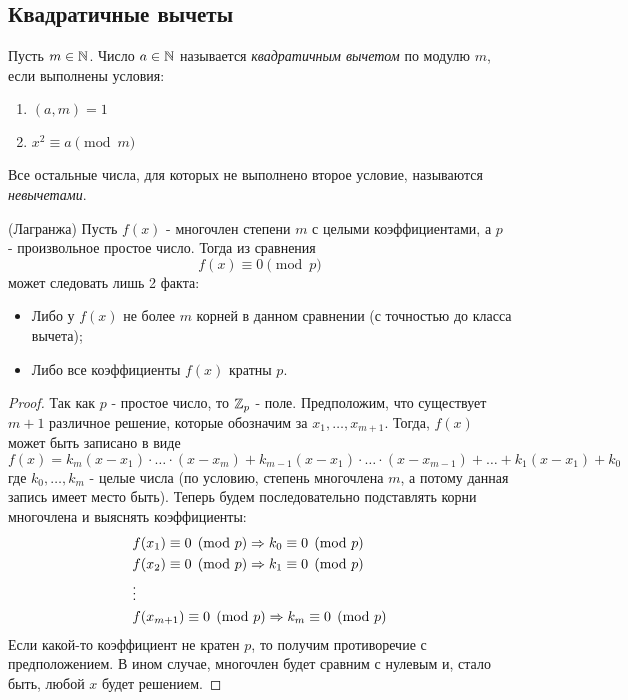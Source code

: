 \subsection{Квадратичные вычеты}

\begin{definition}
	Пусть $m \in \mathbb{N}$. Число $a \in \mathbb{N}$ называется \textit{квадратичным вычетом} по модулю $m$, если выполнены условия:
	\begin{enumerate}
		\item $(a, m) = 1$
		
		\item $x^2 \equiv a \pmod m$
	\end{enumerate}
\end{definition}

\begin{note}
	Все остальные числа, для которых не выполнено второе условие, называются \textit{невычетами}.
\end{note}

\begin{theorem} (Лагранжа)
	Пусть $f(x)$ - многочлен степени $m$ с целыми коэффициентами, а $p$ - произвольное простое число. Тогда из сравнения
	\[
		f(x) \equiv 0 \pmod p
	\]
	может следовать лишь 2 факта:
	\begin{itemize}
		\item Либо у $f(x)$ не более $m$ корней в данном сравнении (с точностью до класса вычета);
		
		\item Либо все коэффициенты $f(x)$ кратны $p$.
	\end{itemize}
\end{theorem}

\begin{proof}
	Так как $p$ - простое число, то $\mathbb{Z}_p$ - поле. Предположим, что существует $m + 1$ различное решение, которые обозначим за $x_1, \ldots, x_{m + 1}$. Тогда, $f(x)$ может быть записано в виде
	\[
		f(x) = k_m (x - x_1) \cdot \ldots \cdot (x - x_m) + k_{m - 1} (x - x_1) \cdot \ldots \cdot (x - x_{m - 1}) + \ldots + k_1 (x - x_1) + k_0
	\]
	где $k_0, \ldots, k_m$ - целые числа (по условию, степень многочлена $m$, а потому данная запись имеет место быть). Теперь будем последовательно подставлять корни многочлена и выяснять коэффициенты:
	\begin{align*}
		&{{f(x_1) \equiv 0 \pmod p} \Rightarrow k_0 \equiv 0 \pmod p}
		\\
		&{{f(x_2) \equiv 0 \pmod p} \Rightarrow k_1 \equiv 0 \pmod p}
		\\
		&\vdots
		\\
		&{{f(x_{m + 1}) \equiv 0 \pmod p} \Rightarrow k_m \equiv 0 \pmod p}
	\end{align*}
	Если какой-то коэффициент не кратен $p$, то получим противоречие с предположением. В ином случае, многочлен будет сравним с нулевым и, стало быть, любой $x$ будет решением.
\end{proof}

